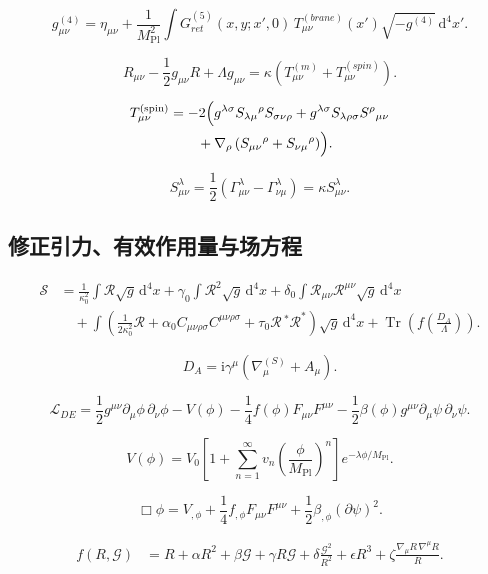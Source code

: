 \documentclass[UTF8,11pt,a4paper]{ctexart}
\newcommand{\R}{\mathcal{R}}
\newcommand{\G}{\mathcal{G}}
\newcommand{\Lag}{\mathcal{L}}
\newcommand{\Tr}{\operatorname{Tr}}
\newcommand{\dd}{\mathrm{d}}
\newcommand{\ii}{\mathrm{i}}
\begin{document}
\[
g^{(4)}_{\mu\nu}
=\eta_{\mu\nu}+\frac{1}{M_{\mathrm{Pl}}^2}
\int G^{(5)}_{ret}(x,y;x',0)\,
T^{(brane)}_{\mu\nu}(x')\sqrt{-g^{(4)}}\,\dd^4x'.
\]

\[
R_{\mu\nu}-\frac12 g_{\mu\nu}R+\Lambda g_{\mu\nu}
=\kappa\left(T^{(m)}_{\mu\nu}+T^{(spin)}_{\mu\nu}\right).
\]

\begin{align*}
T^{(\mathrm{spin})}_{\mu\nu}
&=-2\Bigl(g^{\lambda\sigma}S_{\lambda\mu}{}^{\rho}S_{\sigma\nu\rho}
  +g^{\lambda\sigma}S_{\lambda\rho\sigma}S^{\rho}{}_{\mu\nu}\\
&\qquad+\nabla_\rho\left(S_{\mu\nu}{}^{\rho}+S_{\nu\mu}{}^{\rho}\right)\Bigr).
\end{align*}

\[
S_{\mu\nu}^{\lambda}
=\frac12\left(\Gamma_{\mu\nu}^{\lambda}-\Gamma_{\nu\mu}^{\lambda}\right)
=\kappa S_{\mu\nu}^{\lambda}.
\]

\subsection{修正引力、有效作用量与场方程}

\begin{align*}
\mathcal{S}
&=\frac{1}{\kappa_0^2}\int \R\sqrt{g}\,\dd^4x
 +\gamma_0\int \R^2\sqrt{g}\,\dd^4x
 +\delta_0\int \R_{\mu\nu}\R^{\mu\nu}\sqrt{g}\,\dd^4x\\
&\quad+\int\left(\frac{1}{2\kappa_0^2}\R
 +\alpha_0 C_{\mu\nu\rho\sigma}C^{\mu\nu\rho\sigma}
 +\tau_0 \R\,{}^{*}\R^{*}\right)\sqrt{g}\,\dd^4x
 +\Tr\left(f\left(\frac{D_A}{\Lambda}\right)\right).
\end{align*}

\[
D_A=\ii\gamma^\mu\left(\nabla_\mu^{(S)}+A_\mu\right).
\]

\[
\Lag_{DE}
=\frac12 g^{\mu\nu}\partial_\mu\phi\,\partial_\nu\phi-V(\phi)
-\frac14 f(\phi)F_{\mu\nu}F^{\mu\nu}
-\frac12\beta(\phi)g^{\mu\nu}\partial_\mu\psi\,\partial_\nu\psi .
\]

\[
V(\phi)=V_0\left[1+\sum_{n=1}^{\infty}v_n
\left(\frac{\phi}{M_{\mathrm{Pl}}}\right)^n\right]
e^{-\lambda\phi/M_{\mathrm{Pl}}}.
\]

\[
\Box\phi=V_{,\phi}+\frac14 f_{,\phi}F_{\mu\nu}F^{\mu\nu}
+\frac12\beta_{,\phi}(\partial\psi)^2 .
\]

\begin{align*}
f(R,\G)
&=R+\alpha R^2+\beta\G+\gamma R\G
 +\delta\frac{\G^2}{R^2}+\epsilon R^3
 +\zeta\frac{\nabla_\mu R\,\nabla^\mu R}{R}.
\end{align*}
\end{document}
